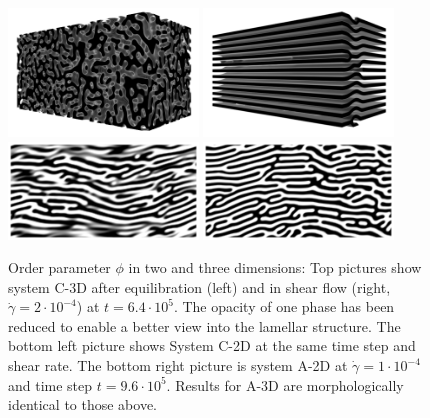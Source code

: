 \documentclass[8.5pt,twoside,twocolumn]{article}
\newcommand{\e}[1]{\cdot10^{#1}}
\begin{document}
\begin{figure}[htp!]
\centering
\includegraphics[angle=0,width=0.45\textwidth]{phi_run1002_320k.png}
\includegraphics[angle=0,width=0.45\textwidth]{phi_run1002_640k.png}
\includegraphics[angle=0,width=0.45\textwidth]{phi_run1001_640k.png}
\includegraphics[angle=0,width=0.45\textwidth]{phi_run1003_960k.png}
\caption{Order parameter $\phi$ in two and three dimensions: Top pictures show system C-3D after equilibration (left) and in shear flow (right, $\dot{\gamma}=2\cdot10^{-4}$) at $t=6.4\e{5}$. The opacity of one phase has been reduced to enable a better view into the lamellar structure. The bottom left picture shows System C-2D at the same time step and shear rate. The bottom right picture is system A-2D at $\dot{\gamma}=1\cdot10^{-4}$ and time step $t=9.6\e{5}$. Results for A-3D are morphologically identical to those above.} 
\label{fig12}
\end{figure}
\end{document}
